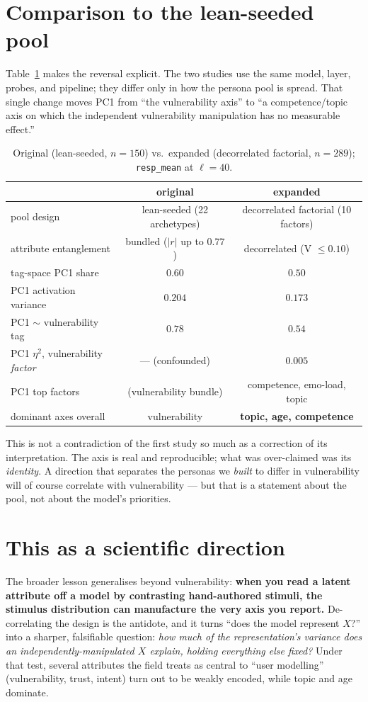 \documentclass[11pt]{article}
\newcommand{\resp}{\texttt{resp\_mean}}
\begin{document}
\section{Comparison to the lean-seeded pool}
Table~\ref{tab:compare} makes the reversal explicit. The two studies use the same
model, layer, probes, and pipeline; they differ only in how the persona pool is
spread. That single change moves PC1 from ``the vulnerability axis'' to ``a
competence/topic axis on which the independent vulnerability manipulation has no
measurable effect.''

\begin{table}[h]
\centering\small
\caption{Original (lean-seeded, $n=150$) vs.\ expanded (decorrelated factorial,
$n=289$); \resp{} at $\ell=40$.}
\label{tab:compare}
\begin{tabular}{@{}lcc@{}}
\toprule
 & original & expanded \\
\midrule
pool design & lean-seeded (22 archetypes) & decorrelated factorial (10 factors) \\
attribute entanglement & bundled ($|r|$ up to $0.77$) & decorrelated (V $\le 0.10$) \\
tag-space PC1 share & $0.60$ & $0.50$ \\
PC1 activation variance & $0.204$ & $0.173$ \\
PC1 $\sim$ vulnerability tag & $\mathbf{0.78}$ & $0.54$ \\
PC1 $\eta^2$, vulnerability \emph{factor} & --- (confounded) & $\mathbf{0.005}$ \\
PC1 top factors & (vulnerability bundle) & competence, emo-load, topic \\
dominant axes overall & vulnerability & \textbf{topic, age, competence} \\
\bottomrule
\end{tabular}
\end{table}

This is not a contradiction of the first study so much as a correction of its
interpretation. The axis is real and reproducible; what was over-claimed was its
\emph{identity}. A direction that separates the personas we \emph{built} to differ
in vulnerability will of course correlate with vulnerability --- but that is a
statement about the pool, not about the model's priorities.

\section{This as a scientific direction}
The broader lesson generalises beyond vulnerability: \textbf{when you read a latent
attribute off a model by contrasting hand-authored stimuli, the stimulus
distribution can manufacture the very axis you report.} De-correlating the design
is the antidote, and it turns ``does the model represent $X$?'' into a sharper,
falsifiable question: \emph{how much of the representation's variance does an
independently-manipulated $X$ explain, holding everything else fixed?} Under that
test, several attributes the field treats as central to ``user modelling''
(vulnerability, trust, intent) turn out to be weakly encoded, while topic and age
dominate.
\end{document}

